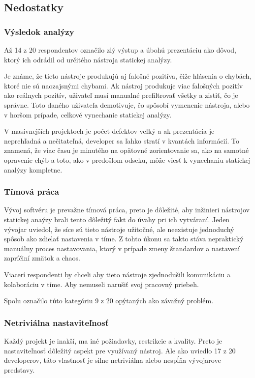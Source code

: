 \documentclass[10pt,twoside,slovak,a4paper]{article}
\begin{document}
\subsection{Nedostatky} \label{vyuzitie:nedostatky}
\subsubsection*{Výsledok analýzy}
Až 14 z 20 respondentov označilo zlý výstup a úbohú prezentáciu ako dôvod, ktorý ich odrádil od určitého nástroja
statickej analýzy.

Je známe, že tieto nástroje produkujú aj falošné pozitíva, čiže hlásenia o chybách, ktoré nie sú
naozajsnými chybami. Ak nástroj produkuje viac falošných pozitív ako reálnych pozitív, uživateľ musí manualné
prefiltrovať všetky a zistiť, čo je správne. Toto daného uživateľa demotivuje, čo spôsobí vymenenie nástroja, alebo v
horšom prípade, celkové vynechanie statickej analýzy.

V masívnejších projektoch je počet defektov veľký a ak prezentácia je neprehľadná a nečitateľná, developer sa ľahko
stratí v kvantách informácií. To znamená, že viac času je minutého na opätovné zorientovanie sa, ako na samotné
opravenie chýb a toto, ako v predošlom odseku, môže viesť k vynechaniu statickej analýzy kompletne.

\subsubsection*{Tímová práca}
Vývoj softvéru je prevažne tímová práca, preto je dôležité, aby inžinieri nástrojov statickej anaýzy brali tento
dôležitý fakt do úvahy pri ich vytváraní. Jeden vývojar uviedol, že síce sú tieto nástroje užitočné, ale neexistuje
jednoduchý spôsob ako zdielať nastavenia v tíme. Z tohto úkonu sa takto stáva nepraktický manuálny proces nastavovania,
ktorý v prípade zmeny štandardov a nastavení zapríčiní zmätok a chaos.

Viacerí respondenti by chceli aby tieto nástroje zjednodušili komunikáciu a kolaboráciu v tíme. Aby nemuseli narušiť
svoj pracovný priebeh.

Spolu označilo túto kategóriu 9 z 20 opýtaných ako závažný problém.

\subsubsection*{Netriviálna nastaviteľnosť}
Každý projekt je inakší, ma iné požiadavky, restrikcie a kvality. Preto je nastaviteľnosť dôležitý aspekt pre využívaný
nástroj. Ale ako uviedlo 17 z 20 developerov, táto vlastnosť je silne netriviálna alebo nespĺňa vývojarove predstavy.
\end{document}
